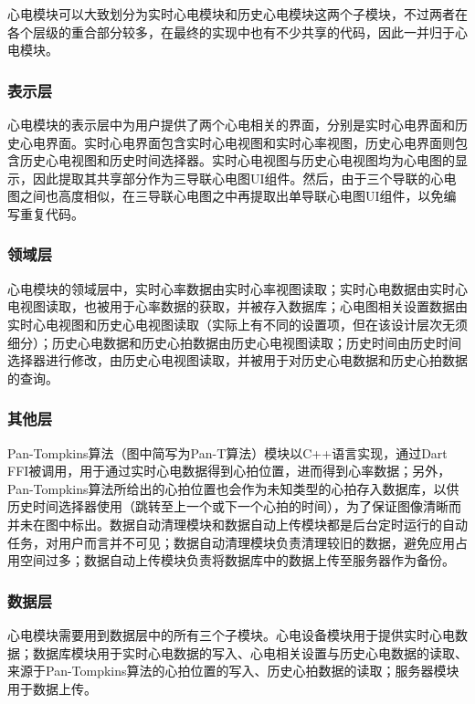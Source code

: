 心电模块可以大致划分为实时心电模块和历史心电模块这两个子模块，不过两者在各个层级的重合部分较多，在最终的实现中也有不少共享的代码，因此一并归于心电模块。

\subsubsection{表示层}

心电模块的表示层中为用户提供了两个心电相关的界面，分别是实时心电界面和历史心电界面。实时心电界面包含实时心电视图和实时心率视图，历史心电界面则包含历史心电视图和历史时间选择器。实时心电视图与历史心电视图均为心电图的显示，因此提取其共享部分作为三导联心电图UI组件。然后，由于三个导联的心电图之间也高度相似，在三导联心电图之中再提取出单导联心电图UI组件，以免编写重复代码。

\subsubsection{领域层}

心电模块的领域层中，实时心率数据由实时心率视图读取；实时心电数据由实时心电视图读取，也被用于心率数据的获取，并被存入数据库；心电图相关设置数据由实时心电视图和历史心电视图读取（实际上有不同的设置项，但在该设计层次无须细分）；历史心电数据和历史心拍数据由历史心电视图读取；历史时间由历史时间选择器进行修改，由历史心电视图读取，并被用于对历史心电数据和历史心拍数据的查询。

\subsubsection{其他层}

Pan-Tompkins算法（图中简写为Pan-T算法）模块以C++语言实现，通过Dart FFI被调用，用于通过实时心电数据得到心拍位置，进而得到心率数据；另外，Pan-Tompkins算法所给出的心拍位置也会作为未知类型的心拍存入数据库，以供历史时间选择器使用（跳转至上一个或下一个心拍的时间），为了保证图像清晰而并未在图中标出。数据自动清理模块和数据自动上传模块都是后台定时运行的自动任务，对用户而言并不可见；数据自动清理模块负责清理较旧的数据，避免应用占用空间过多；数据自动上传模块负责将数据库中的数据上传至服务器作为备份。

\subsubsection{数据层}

心电模块需要用到数据层中的所有三个子模块。心电设备模块用于提供实时心电数据；数据库模块用于实时心电数据的写入、心电相关设置与历史心电数据的读取、来源于Pan-Tompkins算法的心拍位置的写入、历史心拍数据的读取；服务器模块用于数据上传。


